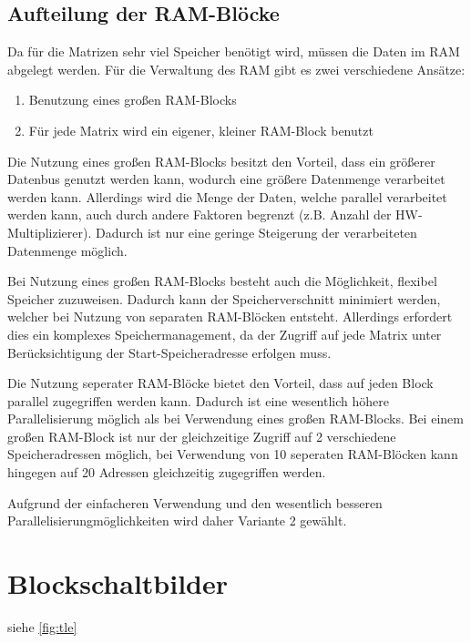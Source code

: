 \documentclass
[ 12pt,
  parskip=half %
]{scrreprt}
\begin{document}
\subsection{Aufteilung der RAM-Blöcke}

Da für die Matrizen sehr viel Speicher benötigt wird, müssen die Daten im RAM abgelegt werden. Für die Verwaltung des RAM gibt es zwei verschiedene Ansätze:
\begin{enumerate}
	\item Benutzung eines großen RAM-Blocks
	\item Für jede Matrix wird ein eigener, kleiner RAM-Block benutzt
\end{enumerate}

Die Nutzung eines großen RAM-Blocks besitzt den Vorteil, dass ein größerer Datenbus genutzt werden kann, wodurch eine größere Datenmenge verarbeitet werden kann. Allerdings wird die Menge der Daten, welche parallel verarbeitet werden kann, auch durch andere Faktoren begrenzt (z.B. Anzahl der HW-Multiplizierer). Dadurch ist nur eine geringe Steigerung der verarbeiteten Datenmenge möglich.

Bei Nutzung eines großen RAM-Blocks besteht auch die  Möglichkeit, flexibel Speicher zuzuweisen. Dadurch kann der Speicherverschnitt minimiert werden, welcher bei Nutzung von separaten RAM-Blöcken entsteht. Allerdings erfordert dies ein komplexes Speichermanagement, da der Zugriff auf jede Matrix unter Berücksichtigung der Start-Speicheradresse erfolgen muss. 

Die Nutzung seperater RAM-Blöcke bietet den Vorteil, dass auf jeden Block parallel zugegriffen werden kann. Dadurch ist eine wesentlich höhere Parallelisierung möglich als bei Verwendung eines großen RAM-Blocks. Bei einem großen RAM-Block ist nur der gleichzeitige Zugriff auf 2 verschiedene Speicheradressen möglich, bei Verwendung von 10 seperaten RAM-Blöcken kann hingegen auf 20 Adressen gleichzeitig zugegriffen werden. 
 

Aufgrund der einfacheren Verwendung und den wesentlich besseren Parallelisierungmöglichkeiten wird daher Variante 2 gewählt.

\section{Blockschaltbilder}

siehe \ref{fig:tle}


\end{document}
